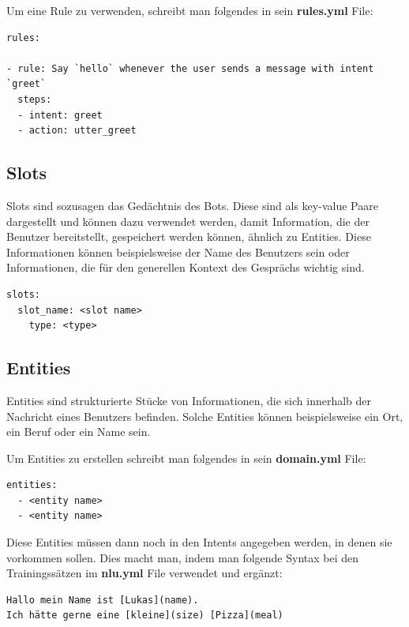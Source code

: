 Um eine Rule zu verwenden, schreibt man folgendes in sein \textbf{rules.yml} File:

\begin{lstlisting}[label={lst: Rules Example}]
rules:

- rule: Say `hello` whenever the user sends a message with intent `greet`
  steps:
  - intent: greet
  - action: utter_greet
\end{lstlisting}



\subsection{Slots}

Slots sind sozusagen das Gedächtnis des Bots.
Diese sind als key-value Paare dargestellt und können dazu verwendet werden, damit Information, die der Benutzer bereitstellt, gespeichert werden können, ähnlich zu Entities.
Diese Informationen können beispielsweise der Name des Benutzers sein oder Informationen, die für den generellen Kontext des Gesprächs wichtig sind.
\cite{slots}

\begin{lstlisting}[label={lst: Slot Example}]
slots:
  slot_name: <slot name>
    type: <type>
\end{lstlisting}


\subsection{Entities}

Entities sind strukturierte Stücke von Informationen, die sich innerhalb der Nachricht eines Benutzers befinden.
Solche Entities können beispielsweise ein Ort, ein Beruf oder ein Name sein.\cite{entities}

Um Entities zu erstellen schreibt man folgendes in sein \textbf{domain.yml} File:

\begin{lstlisting}[label={lst: Entities Domain Example}]
entities:
  - <entity name>
  - <entity name>
\end{lstlisting}

Diese Entities müssen dann noch in den Intents angegeben werden, in denen sie vorkommen sollen.
Dies macht man, indem man folgende Syntax bei den Trainingssätzen im \textbf{nlu.yml} File verwendet und ergänzt:

\begin{lstlisting}[label={lst: Entities NLU Example}]
Hallo mein Name ist [Lukas](name).
Ich hätte gerne eine [kleine](size) [Pizza](meal)
\end{lstlisting}

